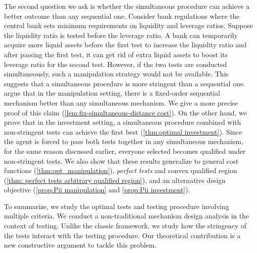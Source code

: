  
The second question we ask is whether the simultaneous procedure can achieve a better outcome than any sequential one.
Consider bank regulations where the central bank sets minimum requirements on liquidity and leverage ratios.
Suppose the liquidity ratio is tested before the leverage ratio.
A bank can temporarily acquire more liquid assets before the first test to increase the liquidity ratio and after passing the first test, it can get rid of extra liquid assets to boost its leverage ratio for the second test.
However, if the two tests are conducted simultaneously, such a manipulation strategy would not be available.
This suggests that a simultaneous procedure is more stringent than a sequential one.
\citet{zigzag} argue that in the manipulation setting, there is a fixed-order sequential mechanism better than any simultaneous mechanism. We give a more precise proof of this claim (\cref{lem:fix-simultaneous-distance cost}).
On the other hand, we prove that in the investment setting, a simultaneous procedure combined with non-stringent tests can achieve the first best (\cref{thm:optimal investment}).
Since the agent is forced to pass both tests together in any simultaneous mechanism, for the same reason discussed earlier, everyone selected becomes qualified under non-stringent tests.
We also show that these results generalize to general cost functions (\cref{thm:opt_manipulation}), \emph{perfect tests} and convex qualified region (\cref{thm: perfect tests arbitrary qualified region}), and an alternative design objective (\cref{prop:Pii manipulation} and \ref{prop:Pii investment}).

To summarize, we study the optimal tests and testing procedure involving multiple criteria. 
We conduct a non-traditional mechanism design analysis in the context of testing. 
Unlike the classic framework, we study how the stringency of the tests interact with the testing procedure. 
Our theoretical contribution is a new constructive argument to tackle this problem.











